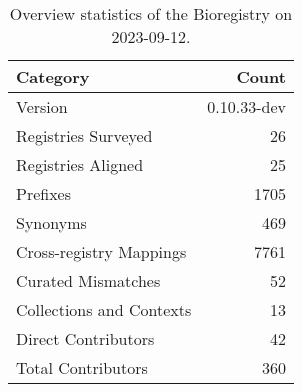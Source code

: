 \begin{table}
\caption{Overview statistics of the Bioregistry on 2023-09-12.}
\label{tab:bioregistry-summary}
\begin{tabular}{lr}
\toprule
Category & Count \\
\midrule
Version & 0.10.33-dev \\
Registries Surveyed & 26 \\
Registries Aligned & 25 \\
Prefixes & 1705 \\
Synonyms & 469 \\
Cross-registry Mappings & 7761 \\
Curated Mismatches & 52 \\
Collections and Contexts & 13 \\
Direct Contributors & 42 \\
Total Contributors & 360 \\
\bottomrule
\end{tabular}
\end{table}
